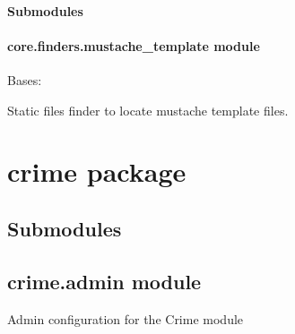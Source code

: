 \documentclass[letterpaper,10pt,english]{sphinxmanual}
\begin{document}
\paragraph{Submodules}
\label{api/core.finders:submodules}

\paragraph{core.finders.mustache\_template module}
\label{api/core.finders:module-core.finders.mustache_template}\label{api/core.finders:core-finders-mustache-template-module}

\begin{fulllineitems}
\label{api/core.finders:core.finders.mustache_template.MustacheTemplateFinder}
Bases: 

Static files finder to locate mustache template files.

\begin{fulllineitems}
\label{api/core.finders:core.finders.mustache_template.MustacheTemplateFinder.source_dir}
\end{fulllineitems}


\end{fulllineitems}



\section{crime package}
\label{api/crime:crime-package}\label{api/crime::doc}

\subsection{Submodules}
\label{api/crime:submodules}

\subsection{crime.admin module}
\label{api/crime:module-crime.admin}\label{api/crime:crime-admin-module}
Admin configuration for the Crime module
\end{document}
